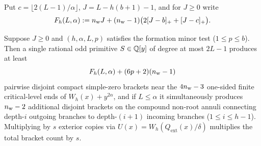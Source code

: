Put $c=\lfloor 2(L-1)/\alpha\rfloor$, $J=L-h(b+1)-1$, and for $J\ge 0$ write
\begin{equation}\label{eq:Fh-native}
  F_h(L,\alpha) := n_{\rm w}J + (n_{\rm w}-1)\bigl(2[J-b]_++[J-c]_+\bigr).
\end{equation}

\begin{theorem}\label{thm:gap-brackets}
Suppose $J\ge 0$ and $(h,\alpha,L,p)$ satisfies the formation minor test ($1\le p\le b$). Then a single rational odd primitive $S\in\mathbb{Q}[y]$ of degree at most $2L-1$ produces at least
\begin{equation}\label{eq:gap-native-total}
  F_h(L,\alpha) + (6p+2)(n_{\rm w}-1)
\end{equation}
pairwise disjoint compact simple-zero brackets near the $4n_{\rm w}-3$ one-sided finite critical-level ends of $W_h(x)+y^{2\alpha}$, and if $L\le\alpha$ it simultaneously produces $n_{\rm w}-2$ additional disjoint brackets on the compound non-root annuli connecting depth-$i$ outgoing branches to depth-$(i+1)$ incoming branches ($1\le i\le h-1$). Multiplying by $s$ exterior copies via $U(x)=W_h(Q_{\mathrm{ext}}(x)/\delta)$ multiplies the total bracket count by $s$.
\end{theorem}

